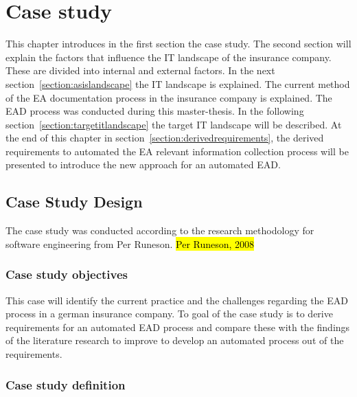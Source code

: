 

\chapter{Case study}\label{chapter:EA documentation in an insurance company} 

This chapter introduces in the first section the case study. The second section will explain the factors that influence the IT landscape of the insurance company. These are divided into internal and external factors. In the next section~\ref{section:asislandscape} the IT landscape is explained. The current method of the EA documentation process in the insurance company is explained. The EAD process was conducted during this  master-thesis.
In the following section~\ref{section:targetitlandscape} the target IT landscape will be described.
At the end of this chapter in section~\ref{section:derivedrequirements}, the derived requirements to automated the EA relevant information collection process will be presented to introduce the new approach for an automated EAD.

\section{Case Study Design}\label{section:casestudy}

The case study was conducted according to the research methodology for software engineering from Per Runeson. \hl{Per Runeson, 2008}

\subsection{Case study objectives}\label{subsection:casestudyobjectives}

This case will identify the current practice and the challenges regarding the EAD process in a german insurance company. To goal of the case study is to derive requirements for an automated EAD process and compare these with the findings of the literature research to improve to develop an automated process out of the requirements.

\subsection{Case study definition}\label{subsection:casestudyobjectives}

